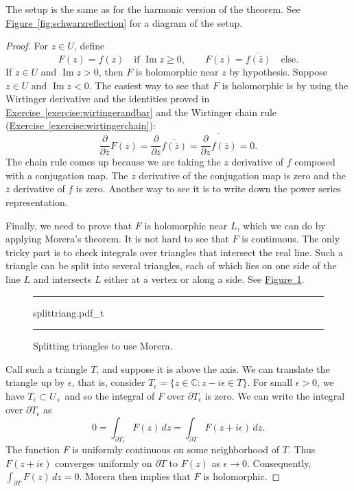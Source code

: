 \documentclass[12pt,openany]{book}
\renewcommand{\Im}{\operatorname{Im}}
\newcommand{\C}{{\mathbb{C}}}
\theoremstyle{plain}
\theoremstyle{remark}
\theoremstyle{definition}
\newenvironment{myfig}{%
\begin{figure}[h!t]
\noindent\rule{\textwidth}{0.5pt}\vspace{12pt}\par\centering}%
{\par\noindent\rule{\textwidth}{0.5pt}
\end{figure}}
\theoremstyle{exercise}
\theoremstyle{example}
\newcommand{\figureref}[1]{\hyperref[#1]{Figure~\ref*{#1}}}
\newcommand{\exerciseref}[1]{\hyperref[#1]{Exercise~\ref*{#1}}}
\begin{document}
The setup is the same as for the harmonic version of the theorem.
See \figureref{fig:schwarzreflection} for a diagram of the setup.

\begin{proof}
For $z \in U$, define
\begin{equation*}
F(z) =
f(z) \quad \text{if } \Im z \geq 0,
\qquad
F(z) =
\overline{f(\bar{z})} \quad \text{else} .
\end{equation*}
If $z \in U$ and $\Im z > 0$, then $F$ is holomorphic near $z$ by hypothesis.
Suppose $z \in U$ and $\Im z < 0$.  The easiest way to see that $F$
is holomorphic is by using the Wirtinger derivative and the
identities proved in \exerciseref{exercise:wirtingerandbar} and
the Wirtinger chain rule (\exerciseref{exercise:wirtingerchain}):
\begin{equation*}
\frac{\partial}{\partial \bar{z}}
F(z)
=
\frac{\partial}{\partial \bar{z}}
\overline{f(\bar{z})}
=
\overline{
\frac{\partial}{\partial z}
f(\bar{z})
}
=
0 .
\end{equation*}
The chain rule comes up because we are taking the $z$ derivative of $f$
composed with a conjugation map.  The $z$ derivative of the conjugation
map is zero and the $\bar{z}$ derivative of $f$ is zero.
Another way to see it is to write down the power series representation.

Finally, we need to prove that $F$ is holomorphic near $L$,
which we can do by applying Morera's theorem.
It is not hard to see that $F$ is continuous.
The only
tricky part is to check integrals over
triangles that intersect the real line.  Such a triangle can be split into
several triangles, each of which lies on one side of the line $L$ and
intersects $L$ either at a vertex or along a side.  See \figureref{fig:splittriang}.

\begin{myfig}
{splittriang.pdf_t}
\caption{Splitting triangles to use Morera.\label{fig:splittriang}}
\end{myfig}

Call such a triangle $T$, and suppose it is above the axis.
We can translate the triangle up by $\epsilon$, that is,
consider $T_\epsilon = \{ z \in \C : z-i\epsilon \in T \}$.
For small $\epsilon > 0$, we have
$T_\epsilon \subset U_+$ and so
the integral of $F$ over $\partial T_\epsilon$
is zero.  We can write the integral over $\partial T_\epsilon$
as
\begin{equation*}
0 = \int_{\partial T_\epsilon} F(z) \, dz =
\int_{\partial T} F(z+i\epsilon) \, dz .
\end{equation*}
The function $F$ is uniformly continuous on some neighborhood of $T$.
Thus $F(z+i\epsilon)$ converges uniformly on $\partial T$ to $F(z)$ as $\epsilon \to 0$.
Consequently, $\int_{\partial T} F(z) \, dz = 0$.
Morera then implies that $F$ is holomorphic.
\end{proof}
\end{document}
